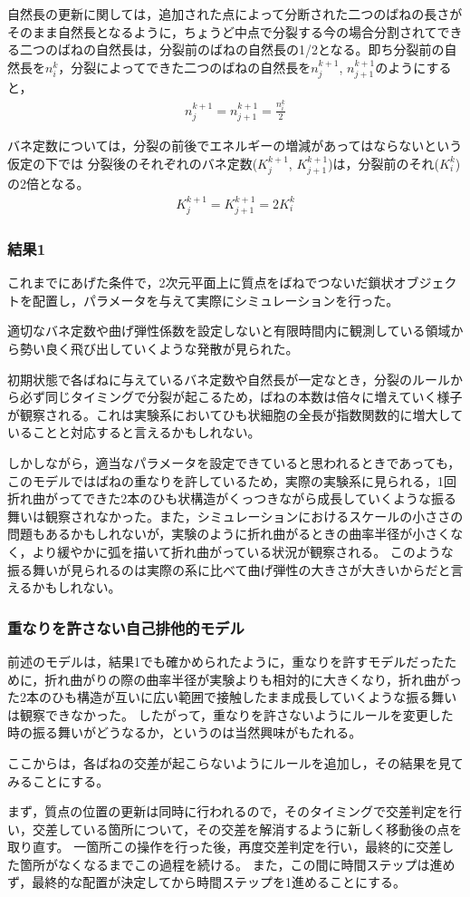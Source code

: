 自然長の更新に関しては，追加された点によって分断された二つのばねの長さがそのまま自然長となるように，ちょうど中点で分裂する今の場合分割されてできる二つのばねの自然長は，分裂前のばねの自然長の1/2となる。即ち分裂前の自然長を$n_{i}^{k}$，分裂によってできた二つのばねの自然長を$n_{j}^{k+1}$, $n_{j+1}^{k+1}$のようにすると，
\begin{eqnarray*}
  n_{j}^{k+1} = n_{j+1}^{k+1} = \frac{n_{i}^{k}}{2}
\end{eqnarray*}

バネ定数については，分裂の前後でエネルギーの増減があってはならないという仮定の下では
分裂後のそれぞれのバネ定数($K_{j}^{k+1}$, $K_{j+1}^{k+1}$)は，分裂前のそれ($K_{i}^{k}$)の2倍となる。
\begin{eqnarray*}
  K_{j}^{k+1} = K_{j+1}^{k+1} = 2 K_{i}^{k}
\end{eqnarray*}

\subsubsection{結果1}

これまでにあげた条件で，2次元平面上に質点をばねでつないだ鎖状オブジェクトを配置し，パラメータを与えて実際にシミュレーションを行った。

適切なバネ定数や曲げ弾性係数を設定しないと有限時間内に観測している領域から勢い良く飛び出していくような発散が見られた。

初期状態で各ばねに与えているバネ定数や自然長が一定なとき，分裂のルールから必ず同じタイミングで分裂が起こるため，ばねの本数は倍々に増えていく様子が観察される。これは実験系においてひも状細胞の全長が指数関数的に増大していることと対応すると言えるかもしれない。

しかしながら，適当なパラメータを設定できていると思われるときであっても，このモデルではばねの重なりを許しているため，実際の実験系に見られる，1回折れ曲がってできた2本のひも状構造がくっつきながら成長していくような振る舞いは観察されなかった。また，シミュレーションにおけるスケールの小ささの問題もあるかもしれないが，実験のように折れ曲がるときの曲率半径が小さくなく，より緩やかに弧を描いて折れ曲がっている状況が観察される。
このような振る舞いが見られるのは実際の系に比べて曲げ弾性の大きさが大きいからだと言えるかもしれない。

\subsubsection{重なりを許さない自己排他的モデル}

前述のモデルは，結果1でも確かめられたように，重なりを許すモデルだったために，折れ曲がりの際の曲率半径が実験よりも相対的に大きくなり，折れ曲がった2本のひも構造が互いに広い範囲で接触したまま成長していくような振る舞いは観察できなかった。
したがって，重なりを許さないようにルールを変更した時の振る舞いがどうなるか，というのは当然興味がもたれる。

ここからは，各ばねの交差が起こらないようにルールを追加し，その結果を見てみることにする。

まず，質点の位置の更新は同時に行われるので，そのタイミングで交差判定を行い，交差している箇所について，その交差を解消するように新しく移動後の点を取り直す。
一箇所この操作を行った後，再度交差判定を行い，最終的に交差した箇所がなくなるまでこの過程を続ける。
また，この間に時間ステップは進めず，最終的な配置が決定してから時間ステップを1進めることにする。
